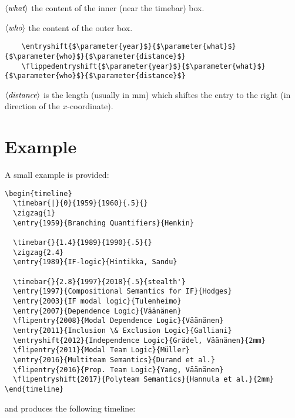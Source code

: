 \documentclass{article}
\newcommand{\parameter}[1]{\langle\normalfont\textit{#1}\rangle}
\begin{document}
\begin{description}
$\parameter{what}$ the content of the inner (near the timebar) box.

$\parameter{who}$ the content of the outer box.

\begin{lstlisting}
	\entryshift{$\parameter{year}$}{$\parameter{what}$}{$\parameter{who}$}{$\parameter{distance}$}
	\flippedentryshift{$\parameter{year}$}{$\parameter{what}$}{$\parameter{who}$}{$\parameter{distance}$}
\end{lstlisting}

$\parameter{distance}$ is the length (usually in mm) which shiftes the entry to the right (in direction of the $x$-coordinate).
\end{description}

\section{Example}
A small example is provided:

\begin{verbatim}
\begin{timeline}
  \timebar{|}{0}{1959}{1960}{.5}{}
  \zigzag{1}
  \entry{1959}{Branching Quantifiers}{Henkin}
  
  \timebar{}{1.4}{1989}{1990}{.5}{}
  \zigzag{2.4}
  \entry{1989}{IF-logic}{Hintikka, Sandu}
  
  \timebar{}{2.8}{1997}{2018}{.5}{stealth'}
  \entry{1997}{Compositional Semantics for IF}{Hodges}
  \entry{2003}{IF modal logic}{Tulenheimo}
  \entry{2007}{Dependence Logic}{Väänänen}
  \flipentry{2008}{Modal Dependence Logic}{Väänänen}
  \entry{2011}{Inclusion \& Exclusion Logic}{Galliani}
  \entryshift{2012}{Independence Logic}{Grädel, Väänänen}{2mm}
  \flipentry{2011}{Modal Team Logic}{Müller}
  \entry{2016}{Multiteam Semantics}{Durand et al.}
  \flipentry{2016}{Prop. Team Logic}{Yang, Väänänen}
  \flipentryshift{2017}{Polyteam Semantics}{Hannula et al.}{2mm}
\end{timeline}
\end{verbatim}
and produces the following timeline:

	\begin{timeline}
	  	
	
  	\end{timeline}
\end{document}
